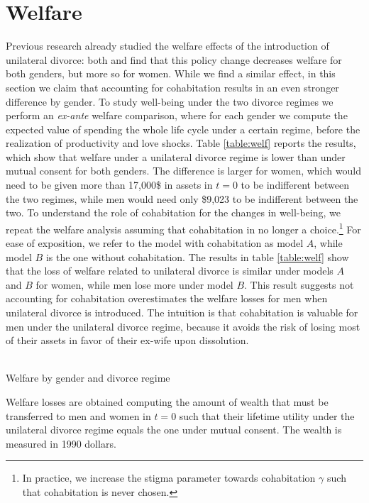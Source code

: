 \documentclass[12pt]{article}
\numberwithin{table}{section}
\begin{document}
\section{Welfare}
Previous research already studied the welfare effects of the introduction of unilateral divorce: both \cite{reynoso2019} and \cite{fernandez2017} find that this policy change decreases welfare for both genders, but more so for women. While we find a similar effect, in this section we claim that accounting for cohabitation results in an even stronger difference by gender.
To study well-being under the two divorce regimes we perform an \textit{ex-ante} welfare comparison, where for each gender we compute the expected value of spending the whole life cycle under a certain regime, before the realization of productivity and love shocks. Table \ref{table:welf} reports the results, which show that welfare under a unilateral divorce regime is lower than under mutual consent for both genders. The difference is larger for women, which would need to be given more than 17,000\$ in assets in $t=0$ to be indifferent between the two regimes, while men would need only \$9,023 to be indifferent between the two. To understand the role of cohabitation for the changes in well-being, we repeat the welfare analysis assuming that cohabitation in no longer a choice.\footnote{In practice, we increase the stigma parameter towards cohabitation $\gamma$ such that cohabitation is never chosen.} For ease of exposition, we refer to the model with cohabitation as model $A$, while model $B$ is the one without cohabitation. The results in table \ref{table:welf} show that the loss of welfare related to unilateral divorce is similar under models $A$ and $B$ for women, while men lose more under model $B$. This result suggests not accounting for cohabitation overestimates the welfare losses for men when unilateral divorce is introduced. The intuition is that cohabitation is valuable for men under the unilateral divorce regime, because it avoids the risk of losing most of their assets in favor of their ex-wife upon dissolution.
\begin{table}[htbp]\centering
\caption{\\Welfare by gender and divorce regime}
\label{table:welf}
\begin{threeparttable}[t]\centering

\begin{tablenotes}[flushleft]
\footnotesize{\item Welfare losses are obtained computing the amount of wealth that must be transferred to men and women in $t=0$ such that their lifetime utility under the unilateral divorce regime equals the one under mutual consent. The wealth is measured in 1990 dollars.}
\end{tablenotes}
\end{threeparttable}
\end{table}
\FloatBarrier
\end{document}
